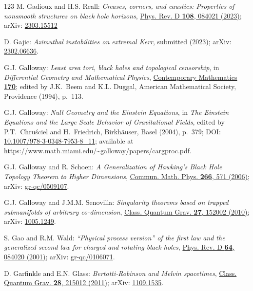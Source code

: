 \begin{thebibliography}{123}
M. Gadioux and H.S. Reall:
{\em Creases, corners, and caustics: Properties of nonsmooth structures on black hole horizons},
\href{https://doi.org/10.1103/PhysRevD.108.084021}{Phys. Rev. D {\bf 108}, 084021 (2023)};
arXiv: \href{https://arxiv.org/abs/2303.15512}{2303.15512}

D. Gajic:
{\em Azimuthal instabilities on extremal Kerr},
submitted (2023);
arXiv: \href{https://arxiv.org/abs/2302.06636}{2302.06636}.

G.J. Galloway:
{\em Least area tori, black holes and topological censorship},
in {\em Differential Geometry and Mathematical Physics},
\href{https://doi.org/10.1090/conm/170}{Contemporary Mathematics {\bf 170}};
edited by  J.K.~Beem and K.L. Duggal,
American Mathematical Society, Providence (1994), p.~113.

G.J. Galloway:
{\em Null Geometry and the Einstein Equations},
in {\em The Einstein Equations and the Large Scale Behavior of Gravitational Fields},
edited by P.T.~Chruściel and H.~Friedrich,
Birkhäuser, Basel (2004), p.~379;
DOI: \href{https://doi.org/10.1007/978-3-0348-7953-8_11}{10.1007/978-3-0348-7953-8\_11};
available at
{\small \url{https://www.math.miami.edu/~galloway/papers/cargproc.pdf}}.

G.J. Galloway and R. Schoen:
{\em A Generalization of Hawking’s Black Hole Topology Theorem to Higher Dimensions},
\href{https://doi.org/10.1007/s00220-006-0019-z}{Commun. Math. Phys. {\bf 266}, 571 (2006)};
arXiv: \href{https://arxiv.org/abs/gr-qc/0509107}{gr-qc/0509107}.

G.J. Galloway and  J.M.M. Senovilla:
{\em Singularity theorems based on trapped submanifolds of arbitrary co-dimension},
\href{https://doi.org/10.1088/0264-9381/27/15/152002}{Class. Quantum Grav. {\bf 27}, 152002 (2010)};
arXiv: \href{https://arxiv.org/abs/1005.1249}{1005.1249}.

S. Gao and R.M. Wald:
{\em ``Physical process version'' of the first law and the generalized second law for charged and rotating black holes},
\href{https://doi.org/10.1103/PhysRevD.64.084020}{Phys. Rev. D {\bf 64}, 084020 (2001)};
arXiv: \href{https://arxiv.org/abs/gr-qc/0106071}{gr-qc/0106071}.

D. Garfinkle and E.N. Glass:
{\em Bertotti-Robinson and Melvin spacetimes},
\href{https://doi.org/10.1088/0264-9381/28/21/215012}{Class. Quantum Grav. {\bf 28}, 215012 (2011)};
arXiv: \href{https://arxiv.org/abs/1109.1535}{1109.1535}.


\end{thebibliography}
